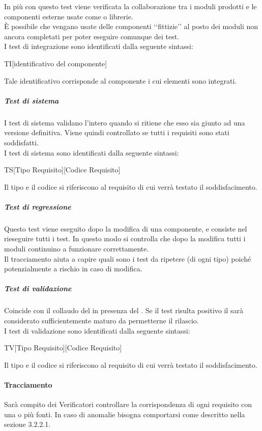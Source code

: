 			In più con questo test viene verificata la collaborazione tra i moduli prodotti e le componenti esterne usate come  o librerie. \\
			È possibile che vengano usate delle componenti ‘‘fittizie’’ al posto dei moduli non ancora completati per poter eseguire comunque dei test. \\
			I test di integrazione sono identificati dalla seguente sintassi:
			\begin{center}
				TI[identificativo del componente]
			\end{center}
			Tale identificativo corrisponde al componente i cui elementi sono integrati.
		\subparagraph{Test di sistema}
		\label{sec:3.2.1.3.3}
			I test di sistema validano l'intero   quando si ritiene che esso sia giunto ad una versione definitiva. Viene quindi controllato se tutti i requisiti sono stati soddisfatti. \\
			I test di sistema sono identificati dalla seguente sintassi:
			\begin{center}
				TS[Tipo Requisito][Codice Requisito]
			\end{center}
			Il tipo e il codice si riferiscono al requisito di cui verrà testato il soddisfacimento.
		\subparagraph{Test di regressione}
		\label{sec:3.2.1.3.4}
			Questo test viene eseguito dopo la modifica di una componente, e consiste nel rieseguire tutti i test. In questo modo si controlla che dopo la modifica tutti i moduli continuino a funzionare correttamente. \\
			Il tracciamento aiuta a capire quali sono i test da ripetere (di ogni tipo) poiché potenzialmente a rischio in caso di modifica.
		\subparagraph{Test di validazione}
		\label{sec:3.2.1.3.5}
			Coincide con il collaudo del  in presenza del . Se il test risulta positivo il  sarà considerato sufficientemente maturo da permetterne il rilascio. \\
			I test di validazione sono identificati dalla seguente sintassi:
			\begin{center}
				TV[Tipo Requisito][Codice Requisito]
			\end{center}
			Il tipo e il codice si riferiscono al requisito di cui verrà testato il soddisfacimento.
	\paragraph{Tracciamento}
	\label{sec:3.2.1.4}
		Sarà compito dei Verificatori controllare la corrispondenza di ogni requisito con una o più fonti. In caso di anomalie bisogna comportarsi come descritto nella sezione 3.2.2.1. %
